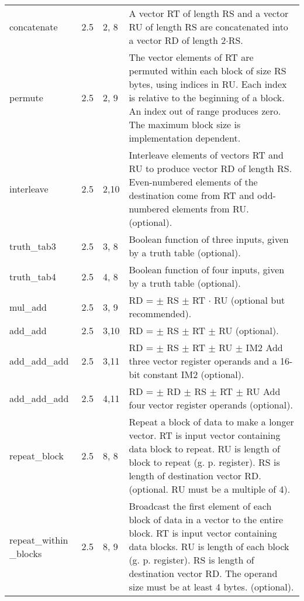 \documentclass[forwardcom.tex]{subfiles}
\begin{document}
\begin{longtable} {|p{20mm}|p{10mm}|p{8mm}|p{75mm}|}
concatenate   & 2.5 & 2, 8 & A vector RT of length RS and a vector RU of length RS are
concatenated into a vector RD of length 2$\cdot$RS. \\

permute       & 2.5 & 2, 9 & The vector elements of RT are permuted within each block of size RS bytes, using indices in RU. Each index is relative to the
beginning of a block. An index out of range produces zero. The
maximum block size is implementation dependent. \\

interleave    & 2.5 & 2,10 & Interleave elements of vectors RT and RU to produce vector RD of length RS. Even-numbered elements of the destination come from RT and odd-numbered elements from RU. (optional). \\

truth\_tab3   & 2.5 & 3, 8 & Boolean function of three inputs, given by a truth table (optional). \\
truth\_tab4   & 2.5 & 4, 8 & Boolean function of four inputs, given by a truth table (optional). \\
mul\_add      & 2.5 & 3, 9 & RD = $\pm$ RS $\pm$ RT $\cdot$ RU (optional but recommended). \\
add\_add      & 2.5 & 3,10 & RD = $\pm$ RS $\pm$ RT $\pm$ RU (optional). \\
add\_add\_add & 2.5 & 3,11 & RD = $\pm$ RS $\pm$ RT $\pm$ RU $\pm$ IM2 
Add three vector register operands and a 16-bit constant IM2 (optional). \\
add\_add\_add & 2.5 & 4,11 & RD = $\pm$ RD $\pm$ RS $\pm$ RT $\pm$ RU
Add four vector register operands (optional). \\

repeat\_block  & 2.5 & 8, 8 & Repeat a block of data to make a longer vector. RT is input vector containing data block to repeat. RU is length of block to repeat (g. p. register). RS is length of destination vector RD. (optional. RU must be a multiple of 4). \\

repeat\_within \_blocks & 2.5 & 8, 9 & Broadcast the first element of each block of data in a vector to the entire block. RT is input vector containing data blocks. RU is length of each block (g. p. register). RS is length of destination vector RD. The operand size must be at least 4 bytes. (optional). \\


\end{longtable}
\end{document}
